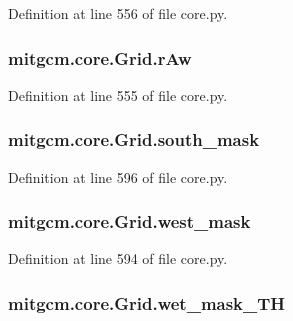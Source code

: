 Definition at line 556 of file core.\+py.

\hypertarget{classmitgcm_1_1core_1_1Grid_adbed7b029a384434aca96fc553ded624}{
\subsubsection[{r\+Aw}]{\setlength{\rightskip}{0pt plus 5cm}mitgcm.\+core.\+Grid.\+r\+Aw}}\label{classmitgcm_1_1core_1_1Grid_adbed7b029a384434aca96fc553ded624}


Definition at line 555 of file core.\+py.

\hypertarget{classmitgcm_1_1core_1_1Grid_a4f70506e6225a48f53c4f57299ad0da8}{
\subsubsection[{south\+\_\+mask}]{\setlength{\rightskip}{0pt plus 5cm}mitgcm.\+core.\+Grid.\+south\+\_\+mask}}\label{classmitgcm_1_1core_1_1Grid_a4f70506e6225a48f53c4f57299ad0da8}


Definition at line 596 of file core.\+py.

\hypertarget{classmitgcm_1_1core_1_1Grid_ac9afe3373e16ca1b8343f8669b9eb4bb}{
\subsubsection[{west\+\_\+mask}]{\setlength{\rightskip}{0pt plus 5cm}mitgcm.\+core.\+Grid.\+west\+\_\+mask}}\label{classmitgcm_1_1core_1_1Grid_ac9afe3373e16ca1b8343f8669b9eb4bb}


Definition at line 594 of file core.\+py.

\hypertarget{classmitgcm_1_1core_1_1Grid_a4f7637908d982efab96f34c32fed20bd}{
\subsubsection[{wet\+\_\+mask\+\_\+\+T\+H}]{\setlength{\rightskip}{0pt plus 5cm}mitgcm.\+core.\+Grid.\+wet\+\_\+mask\+\_\+\+T\+H}}\label{classmitgcm_1_1core_1_1Grid_a4f7637908d982efab96f34c32fed20bd}


